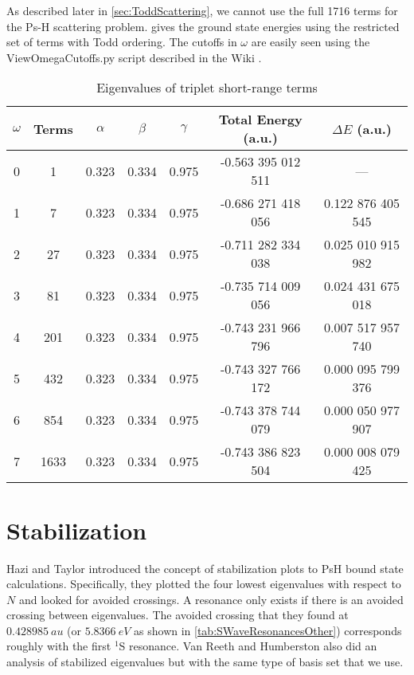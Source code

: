 \documentclass[Dissertation.tex]{subfiles}
\begin{document}
As described later in \cref{sec:ToddScattering}, we cannot use the full 1716 
terms for the Ps-H scattering problem.  gives the 
ground state energies using the restricted set of terms with Todd ordering. 
The cutoffs in $\omega$ are easily seen using the ViewOmegaCutoffs.py script 
described in the Wiki \cite{Wiki}.

\setlength{\abovecaptionskip}{6pt}   %
\setlength{\belowcaptionskip}{6pt}   %
\begin{table}
\centering
\begin{tabular}{c c c c c c c}
\toprule
$\omega$ & Terms & $\alpha$ & $\beta$ & $\gamma$ & Total Energy (a.u.) & $\Delta E$ (a.u.) \\ [0.5ex]
\midrule
0 & 1    & 0.323 & 0.334 & 0.975 & -0.563 395 012 511 & --- \\
1 & 7    & 0.323 & 0.334 & 0.975 & -0.686 271 418 056 & 0.122 876 405 545 \\
2 & 27   & 0.323 & 0.334 & 0.975 & -0.711 282 334 038 & 0.025 010 915 982 \\
3 & 81   & 0.323 & 0.334 & 0.975 & -0.735 714 009 056 & 0.024 431 675 018 \\
4 & 201  & 0.323 & 0.334 & 0.975 & -0.743 231 966 796 & 0.007 517 957 740 \\
5 & 432  & 0.323 & 0.334 & 0.975 & -0.743 327 766 172 & 0.000 095 799 376 \\
6 & 854  & 0.323 & 0.334 & 0.975 & -0.743 378 744 079 & 0.000 050 977 907 \\
7 & 1633 & 0.323 & 0.334 & 0.975 & -0.743 386 823 504 & 0.000 008 079 425 \\
\bottomrule
\end{tabular}
\caption{Eigenvalues of triplet short-range terms}
\label{tab:BoundEnergyTodd3}
\end{table}


\section{Stabilization}

Hazi and Taylor \cite{Hazi1970} introduced the concept of stabilization plots 
to PsH bound state calculations.
Specifically, they plotted 
the four lowest eigenvalues with respect to $N$ and looked for avoided 
crossings. A resonance only exists if there is an avoided crossing between 
eigenvalues. The avoided crossing that they found at $\SI{0.428 985}{au}$ (or 
$\SI{5.8366}{eV}$ as shown in \cref{tab:SWaveResonancesOther}) corresponds 
roughly with the first $^1$S resonance. Van Reeth and Humberston \cite{
VanReeth2004} also did an analysis of stabilized eigenvalues but with the 
same type of basis set that we use.
\end{document}
